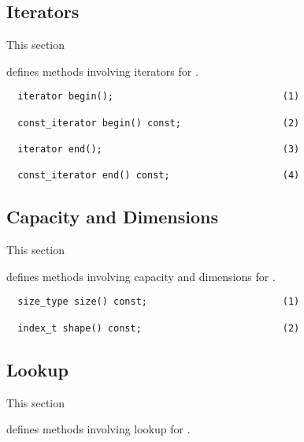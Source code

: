 

\subsection{Iterators}
\hypertarget{iterators}{This section} defines methods involving iterators for .

\begin{verbatim}
  iterator begin();                              (1)

  const_iterator begin() const;                  (2)

  iterator end();                                (3)

  const_iterator end() const;                    (4)
\end{verbatim}


\subsection{Capacity and Dimensions}
\hypertarget{capacity}{This section} defines methods involving capacity and dimensions for .

\begin{verbatim}
  size_type size() const;                        (1)

  index_t shape() const;                         (2)
\end{verbatim}


\subsection{Lookup}
\hypertarget{lookup}{This section} defines methods involving lookup for .


